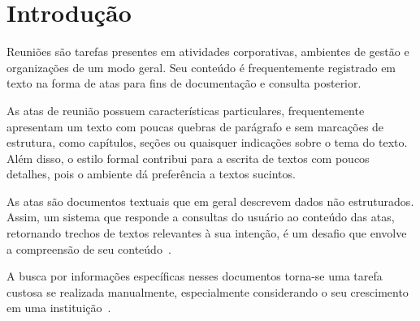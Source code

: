 \chapter{Introdução}\label{chap:introducao}




Reuniões são tarefas presentes em atividades corporativas, ambientes de gestão e organizações de um modo geral. Seu conteúdo é frequentemente registrado em texto na forma de atas para fins de documentação e consulta posterior. 




%   
As atas de reunião possuem características particulares, frequentemente apresentam um texto com poucas quebras de parágrafo e sem marcações de estrutura, como capítulos, seções ou quaisquer indicações sobre o tema do texto. Além disso, o estilo formal contribui para a escrita de textos com poucos detalhes, pois o ambiente dá preferência a textos sucintos. 











As atas são documentos textuais que em geral descrevem dados não estruturados. Assim, um sistema que responde a consultas do usuário ao conteúdo das atas, retornando trechos de textos relevantes à sua intenção, é um desafio que envolve a compreensão de seu conteúdo~\cite{Bokaei2015}. 



A busca por informações específicas nesses documentos torna-se uma tarefa custosa se realizada manualmente, especialmente considerando o seu crescimento em uma instituição~\cite{Lee2011, Masakazu2013, Miriam2013}.



